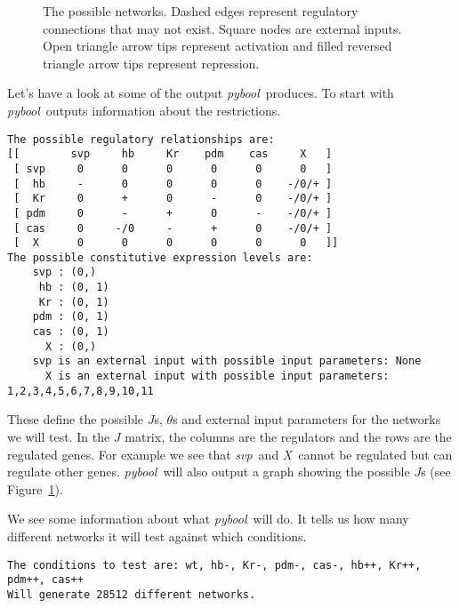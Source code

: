 \documentclass{article}
\newcommand{\pybool}{\emph{pybool}}
\newcommand{\svp}{\emph{svp}}
\newcommand{\X}{\emph{X}}
\begin{document}
\begin{figure}[!tpb]
\center

\caption{The possible networks. Dashed edges represent regulatory connections that may not exist. Square nodes are external inputs. Open triangle arrow tips represent activation and filled reversed triangle arrow tips represent repression.}
\label{fig:restrictions}
\end{figure}




Let's have a look at some of the output \pybool\ produces. To start with \pybool\ outputs information about the restrictions.
\begin{lstlisting}[style=output]
The possible regulatory relationships are:
[[        svp     hb     Kr    pdm    cas     X   ]
 [ svp     0      0      0      0      0      0   ]
 [  hb     -      0      0      0      0    -/0/+ ]
 [  Kr     0      +      0      -      0    -/0/+ ]
 [ pdm     0      -      +      0      -    -/0/+ ]
 [ cas     0     -/0     -      +      0    -/0/+ ]
 [  X      0      0      0      0      0      0   ]]
The possible constitutive expression levels are:
    svp : (0,)
     hb : (0, 1)
     Kr : (0, 1)
    pdm : (0, 1)
    cas : (0, 1)
      X : (0,)
    svp is an external input with possible input parameters: None
      X is an external input with possible input parameters: 1,2,3,4,5,6,7,8,9,10,11
\end{lstlisting}
These define the possible $J$s, $\theta$s and external input parameters for the networks we will test. In the $J$ matrix, the columns are the regulators and the rows are the regulated genes. For example we see that \svp\ and \X\ cannot be regulated but can regulate other genes. \pybool\ will also output a graph showing the possible $J$s (see Figure~\ref{fig:restrictions}).

We see some information about what \pybool\ will do. It tells us how many different networks it will test against which conditions.
\begin{lstlisting}[style=output]
The conditions to test are: wt, hb-, Kr-, pdm-, cas-, hb++, Kr++, pdm++, cas++
Will generate 28512 different networks.
\end{lstlisting}
\end{document}
